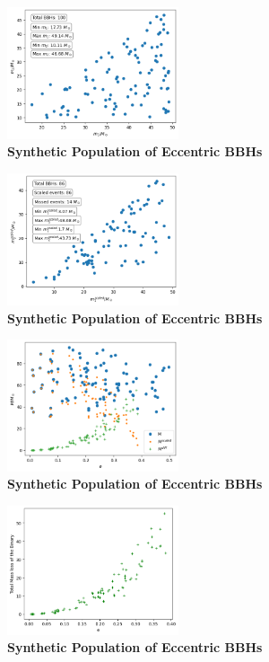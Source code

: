 \documentclass[twocolumn,prd,nofootinbib]{revtex4}
\begin{document}
\begin{figure}
\includegraphics[width=0.45\textwidth]{paper/figures/pop2d05.png}
\caption{\label{fig:population05}\textbf{Synthetic Population of Eccentric BBHs}}
\end{figure}

\begin{figure}
\includegraphics[width=0.45\textwidth]{paper/figures/pop2d05scl.png}
\caption{\label{fig:population05}\textbf{Synthetic Population of Eccentric BBHs}}
\end{figure}
\begin{figure}
\includegraphics[width=0.45\textwidth]{paper/figures/pop2d05diff.png}
\caption{\label{fig:population05}\textbf{Synthetic Population of Eccentric BBHs}}
\end{figure}
\begin{figure}
\includegraphics[width=0.45\textwidth]{paper/figures/massloss05.png}
\caption{\label{fig:population05}\textbf{Synthetic Population of Eccentric BBHs}}
\end{figure}
\end{document}
